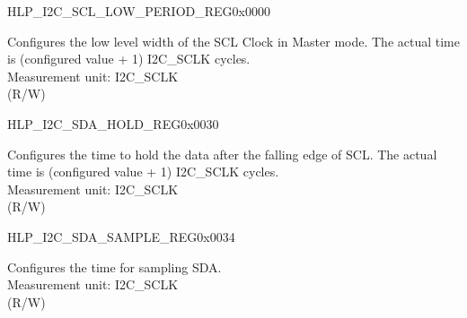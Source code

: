 \begin{register}{H}{LP\_I2C\_SCL\_LOW\_PERIOD\_REG}{0x0000}\label{regdesc:LPI2CSCLLOWPERIODREG}
    \regnewline%
    \begin{regdesc}\begin{reglist}
    \label{fielddesc:LPI2CSCLLOWPERIOD}\item [LP\_I2C\_SCL\_LOW\_PERIOD] Configures the low level width of the SCL Clock in Master mode. The actual time is (configured value + 1) I2C\_SCLK cycles. \\
Measurement unit: I2C\_SCLK \\ (R/W)
    \end{reglist}\end{regdesc}
    \end{register}
    
    
    \begin{register}{H}{LP\_I2C\_SDA\_HOLD\_REG}{0x0030}\label{regdesc:LPI2CSDAHOLDREG}
    \regnewline%
    \begin{regdesc}\begin{reglist}
    \label{fielddesc:LPI2CSDAHOLDTIME}\item [LP\_I2C\_SDA\_HOLD\_TIME] Configures the time to hold the data after the falling edge of SCL. The actual time is (configured value + 1) I2C\_SCLK cycles.\\
Measurement unit: I2C\_SCLK \\ (R/W)
    \end{reglist}\end{regdesc}
    \end{register}
    
    
    \begin{register}{H}{LP\_I2C\_SDA\_SAMPLE\_REG}{0x0034}\label{regdesc:LPI2CSDASAMPLEREG}
    \regnewline%
    \begin{regdesc}\begin{reglist}
    \label{fielddesc:LPI2CSDASAMPLETIME}\item [LP\_I2C\_SDA\_SAMPLE\_TIME] Configures the time for sampling SDA.\\
Measurement unit: I2C\_SCLK \\ (R/W)
    \end{reglist}\end{regdesc}
    \end{register}
    
